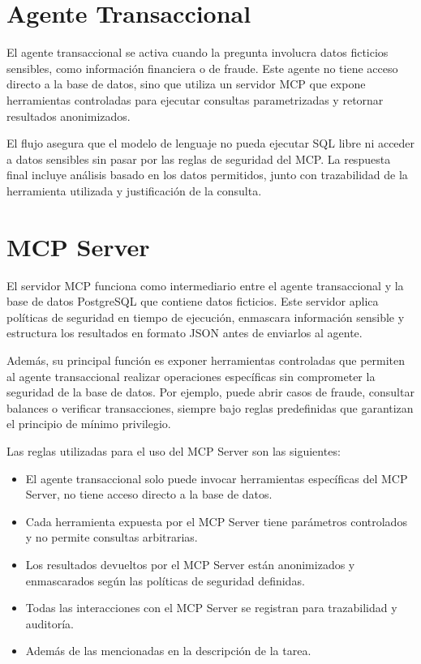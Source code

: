 \documentclass[conference]{IEEEtran}
\begin{document}
\section{Agente Transaccional}

El agente transaccional se activa cuando la pregunta involucra datos ficticios sensibles, como información financiera o de fraude. Este agente no tiene acceso directo a la base de datos, sino que utiliza un servidor MCP que expone herramientas controladas para ejecutar consultas parametrizadas y retornar resultados anonimizados.

El flujo asegura que el modelo de lenguaje no pueda ejecutar SQL libre ni acceder a datos sensibles sin pasar por las reglas de seguridad del MCP. La respuesta final incluye análisis basado en los datos permitidos, junto con trazabilidad de la herramienta utilizada y justificación de la consulta.


\section{MCP Server}
El servidor MCP funciona como intermediario entre el agente transaccional y la base de datos PostgreSQL que contiene datos ficticios. Este servidor aplica políticas de seguridad en tiempo de ejecución, enmascara información sensible y estructura los resultados en formato JSON antes de enviarlos al agente.

Además, su principal función es exponer herramientas controladas que permiten al agente transaccional realizar operaciones específicas sin comprometer la seguridad de la base de datos. Por ejemplo, puede abrir casos de fraude, consultar balances o verificar transacciones, siempre bajo reglas predefinidas que garantizan el principio de mínimo privilegio.

Las reglas utilizadas para el uso del MCP Server son las siguientes:

\begin{itemize}
    \item El agente transaccional solo puede invocar herramientas específicas del MCP Server, no tiene acceso directo a la base de datos.
    \item Cada herramienta expuesta por el MCP Server tiene parámetros controlados y no permite consultas arbitrarias.
    \item Los resultados devueltos por el MCP Server están anonimizados y enmascarados según las políticas de seguridad definidas.
    \item Todas las interacciones con el MCP Server se registran para trazabilidad y auditoría.
    \item Además de las mencionadas en la descripción de la tarea.
\end{itemize}
\end{document}
